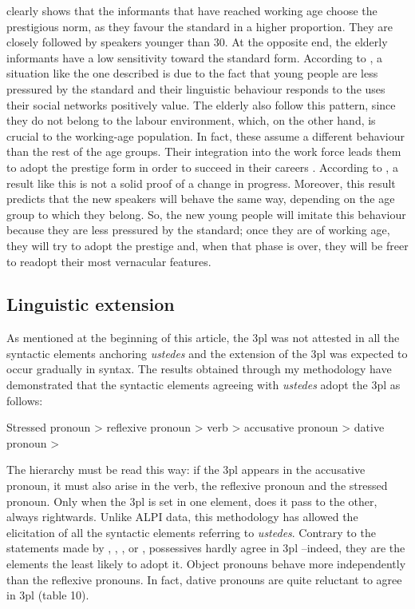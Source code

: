 \documentclass[output=paper]{LSP/langsci}
\begin{document}
 clearly shows that the informants that have reached working age choose the prestigious norm, as they favour the standard in a higher proportion. They are closely followed by speakers younger than 30. At the opposite end, the elderly informants have a low sensitivity toward the standard form. According to \citet{chambers_dialectology_1980}, a situation like the one described is due to the fact that young people are less pressured by the standard and their linguistic behaviour responds to the uses their social networks positively value. The elderly also follow this pattern, since they do not belong to the labour environment, which, on the other hand, is crucial to the working-age population. In fact, these assume a different behaviour than the rest of the age groups. Their integration into the work force leads them to adopt the prestige form in order to succeed in their careers \citep{macaulay_language_1977,bourdieu_mercado_1978,seara_variacao_2000}. According to \citet{chambers_dialectology_1980}, a result like this is not a solid proof of a change in progress. Moreover, this result predicts that the new speakers will behave the same way, depending on the age group to which they belong. So, the new young people will imitate this behaviour because they are less pressured by the standard; once they are of working age, they will try to adopt the prestige and, when that phase is over, they will be freer to readopt their most vernacular features.

\subsection{Linguistic extension}
As mentioned at the beginning of this article, the 3pl was not attested in all the syntactic elements anchoring \textit{ustedes} and the extension of the 3pl was expected to occur gradually in syntax. The results obtained through my methodology have demonstrated that the syntactic elements agreeing with \textit{ustedes} adopt the 3pl as follows:

\begin{exe}
\ex Stressed pronoun {\textgreater} reflexive pronoun {\textgreater} verb {\textgreater} accusative pronoun {\textgreater} dative pronoun {\textgreater}
\end{exe}

The hierarchy must be read this way: if the 3pl appears in the accusative pronoun, it must also arise in the verb, the reflexive pronoun and the stressed pronoun. Only when the 3pl is set in one element, does it pass to the other, always rightwards. Unlike ALPI data, this methodology has allowed the elicitation of all the syntactic elements referring to \textit{ustedes}. Contrary to the statements made by \citet{mondejar_verbo_1974}, \citet{lapesa_estudios_2000}, \citet{cano_historia_2004}, \citet{penny_variacion_2004} or \citet{menendez_pidal_historia_2005}, possessives hardly agree in 3pl –indeed, they are the elements the least likely to adopt it. Object pronouns behave more independently than the reflexive pronouns. In fact, dative pronouns are quite reluctant to agree in 3pl (table 10). 
\end{document}
